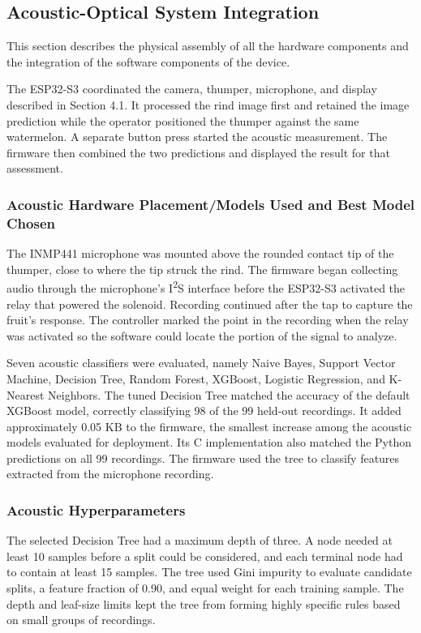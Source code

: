 \begin{thesisprose}
\subsection{Acoustic-Optical System Integration}

This section describes the physical assembly of all the hardware components and the integration of the software components of the device.

The ESP32-S3 coordinated the camera, thumper, microphone, and display described in Section 4.1. It processed the rind image first and retained the image prediction while the operator positioned the thumper against the same watermelon. A separate button press started the acoustic measurement. The firmware then combined the two predictions and displayed the result for that assessment.

\subsubsection*{Acoustic Hardware Placement/Models Used and Best Model Chosen}

The INMP441 microphone was mounted above the rounded contact tip of the thumper, close to where the tip struck the rind. The firmware began collecting audio through the microphone’s I\textsuperscript{2}S interface before the ESP32-S3 activated the relay that powered the solenoid. Recording continued after the tap to capture the fruit’s response. The controller marked the point in the recording when the relay was activated so the software could locate the portion of the signal to analyze.

Seven acoustic classifiers were evaluated, namely Naive Bayes, Support Vector Machine, Decision Tree, Random Forest, XGBoost, Logistic Regression, and K-Nearest Neighbors. The tuned Decision Tree matched the accuracy of the default XGBoost model, correctly classifying 98 of the 99 held-out recordings. It added approximately 0.05 KB to the firmware, the smallest increase among the acoustic models evaluated for deployment. Its C implementation also matched the Python predictions on all 99 recordings. The firmware used the tree to classify features extracted from the microphone recording.

\subsubsection*{Acoustic Hyperparameters}

The selected Decision Tree had a maximum depth of three. A node needed at least 10 samples before a split could be considered, and each terminal node had to contain at least 15 samples. The tree used Gini impurity to evaluate candidate splits, a feature fraction of 0.90, and equal weight for each training sample. The depth and leaf-size limits kept the tree from forming highly specific rules based on small groups of recordings.


\end{thesisprose}
